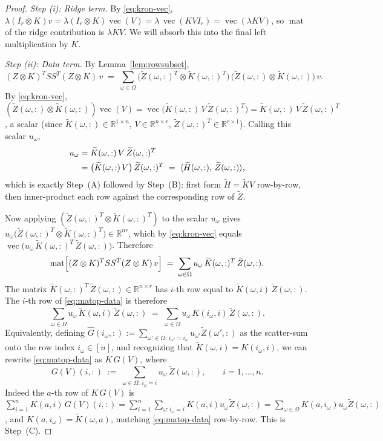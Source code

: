 \documentclass[12pt]{article}
\theoremstyle{definition}
\newcommand{\vecop}{\operatorname{vec}}
\newcommand{\matop}{\operatorname{mat}}
\newcommand{\R}{\mathbb{R}}
\newcommand{\Ht}{\widetilde{H}}
\newcommand{\Kt}{\widetilde{K}}
\newcommand{\Zt}{\widetilde{Z}}
\begin{document}
\begin{proof}
\emph{Step (i): Ridge term.}
By \eqref{eq:kron-vec}, $\lambda(I_r\otimes K)v=\lambda(I_r\otimes K)\vecop(V)
=\lambda\,\vecop(K V I_r)=\vecop(\lambda K V)$, so $\matop$ of the ridge contribution is
$\lambda KV$. We will absorb this into the final left multiplication by $K$.

\emph{Step (ii): Data term.}
By Lemma~\ref{lem:rowsubset},
\[
(Z\otimes K)^T SS^T (Z\otimes K)\,v
\;=\; \sum_{\omega\in\Omega} \bigl(\Zt(\omega,:)^T\otimes \Kt(\omega,:)^T\bigr)\,
\bigl(\Zt(\omega,:)\otimes \Kt(\omega,:)\bigr)\,v.
\]
By \eqref{eq:kron-vec}, $(\Zt(\omega,:)\otimes \Kt(\omega,:))\vecop(V)
=\vecop\bigl(\Kt(\omega,:)\,V\,\Zt(\omega,:)^T\bigr)
=\Kt(\omega,:)\,V\,\Zt(\omega,:)^T$, a scalar (since $\Kt(\omega,:)\in\R^{1\times n}$,
$V\in\R^{n\times r}$, $\Zt(\omega,:)^T\in\R^{r\times 1}$). Calling this scalar $u_\omega$,
\begin{align}
u_\omega
&= \Kt(\omega,:)\,V\,\Zt(\omega,:)^T \notag\\
&= \bigl(\Kt(\omega,:)\,V\bigr)\,\Zt(\omega,:)^T
\;=\; \langle \Ht(\omega,:),\,\Zt(\omega,:)\rangle, \label{eq:u-def}
\end{align}
which is exactly Step~(A) followed by Step~(B): first form $\Ht=\Kt V$ row-by-row, then
inner-product each row against the corresponding row of $\Zt$.

Now applying $(\Zt(\omega,:)^T\otimes \Kt(\omega,:)^T)$ to the scalar $u_\omega$ gives
$u_\omega\bigl(\Zt(\omega,:)^T\otimes\Kt(\omega,:)^T\bigr)\in\R^{nr}$, which by
\eqref{eq:kron-vec} equals $\vecop\bigl(u_\omega\,\Kt(\omega,:)^T\,\Zt(\omega,:)\bigr)$.
Therefore
\begin{equation}\label{eq:matop-data}
\matop\Bigl[(Z\otimes K)^T SS^T (Z\otimes K)\,v\Bigr]
\;=\; \sum_{\omega\in\Omega} u_\omega\,\Kt(\omega,:)^T\,\Zt(\omega,:).
\end{equation}
The matrix $\Kt(\omega,:)^T\,\Zt(\omega,:)\in\R^{n\times r}$ has $i$-th row equal to
$\Kt(\omega,i)\,\Zt(\omega,:)$. The $i$-th row of \eqref{eq:matop-data} is therefore
\[
\sum_{\omega\in\Omega} u_\omega\,\Kt(\omega,i)\,\Zt(\omega,:)
\;=\; \sum_{\omega\in\Omega} u_\omega\,K(i_\omega,i)\,\Zt(\omega,:).
\]
Equivalently, defining
$\widehat{G}(i_\omega,:):=\sum_{\omega'\in\Omega:\,i_{\omega'}=i_\omega} u_{\omega'}\Zt(\omega',:)$
as the scatter-sum onto the row index $i_\omega\in[n]$, and recognizing that
$\Kt(\omega,i)=K(i_\omega,i)$, we can rewrite \eqref{eq:matop-data} as $K\,G(V)$, where
\begin{equation}\label{eq:G-def}
G(V)(i,:) \;:=\; \sum_{\omega\in\Omega:\,i_\omega=i} u_\omega\,\Zt(\omega,:),\qquad i=1,\dots,n.
\end{equation}
Indeed the $a$-th row of $K\,G(V)$ is $\sum_{i=1}^n K(a,i)\,G(V)(i,:)
=\sum_{i=1}^n\sum_{\omega:i_\omega=i}K(a,i)u_\omega\Zt(\omega,:)
=\sum_{\omega\in\Omega}K(a,i_\omega)u_\omega\Zt(\omega,:)$, and $K(a,i_\omega)=\Kt(\omega,a)$,
matching \eqref{eq:matop-data} row-by-row. This is Step~(C).


\end{proof}
\end{document}
